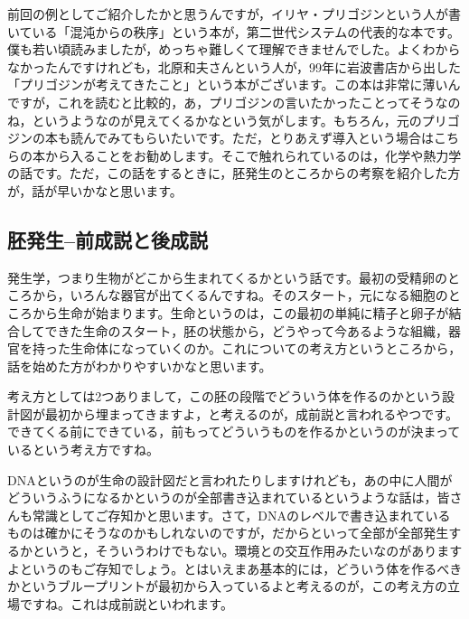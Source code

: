 \documentclass{ltjsbook}
\begin{document}
前回の例としてご紹介したかと思うんですが，イリヤ・プリゴジンという人が書いている「混沌からの秩序」という本\parencite{Prigogine}が，第二世代システムの代表的な本です。僕も若い頃読みましたが，めっちゃ難しくて理解できませんでした。よくわからなかったんですけれども，北原和夫さんという人が，99年に岩波書店から出した「プリゴジンが考えてきたこと」という本がございます\parencite{Kitahara1999}。この本は非常に薄いんですが，これを読むと比較的，あ，プリゴジンの言いたかったことってそうなのね，というようなのが見えてくるかなという気がします。もちろん，元のプリゴジンの本も読んでみてもらいたいです。ただ，とりあえず導入という場合はこちらの本から入ることをお勧めします。そこで触れられているのは，化学や熱力学の話です。ただ，この話をするときに，胚発生のところからの考察を紹介した方が，話が早いかなと思います。


\subsection{胚発生--前成説と後成説}

発生学，つまり生物がどこから生まれてくるかという話です。最初の受精卵のところから，いろんな器官が出てくるんですね。そのスタート，元になる細胞のところから生命が始まります。生命というのは，この最初の単純に精子と卵子が結合してできた生命のスタート，胚の状態から，どうやって今あるような組織，器官を持った生命体になっていくのか。これについての考え方というところから，話を始めた方がわかりやすいかなと思います。

考え方としては2つありまして，この胚の段階でどういう体を作るのかという設計図が最初から埋まってきますよ，と考えるのが，成前説と言われるやつです。できてくる前にできている，前もってどういうものを作るかというのが決まっているという考え方ですね。

DNAというのが生命の設計図だと言われたりしますけれども，あの中に人間がどういうふうになるかというのが全部書き込まれているというような話は，皆さんも常識としてご存知かと思います。さて，DNAのレベルで書き込まれているものは確かにそうなのかもしれないのですが，だからといって全部が全部発生するかというと，そういうわけでもない。環境との交互作用みたいなのがありますよというのもご存知でしょう。とはいえまあ基本的には，どういう体を作るべきかというブループリントが最初から入っているよと考えるのが，この考え方の立場ですね。これは成前説といわれます。
\end{document}
